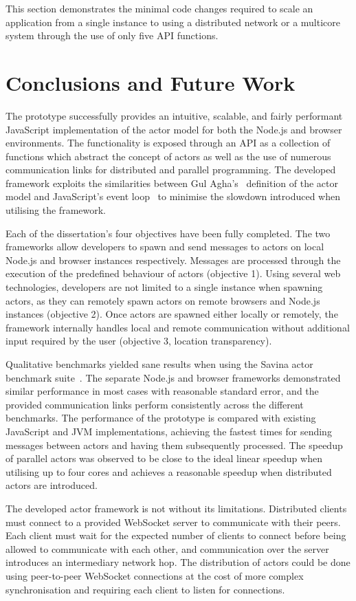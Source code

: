 \documentclass[12pt, a4paper]{report}
\theoremstyle{definition}
\theoremstyle{definition}%
\theoremstyle{definition}%
\theoremstyle{definition}%
\theoremstyle{definition}%
\theoremstyle{definition}%
\begin{document}
This section demonstrates the minimal code changes required to scale an application from a single instance to using a distributed network or a multicore system through the use of only five API functions.
\chapter{Conclusions and Future Work}
The prototype successfully provides an intuitive, scalable, and fairly performant JavaScript implementation of the actor model for both the Node.js and browser environments. The functionality is exposed through an API as a collection of functions which abstract the concept of actors as well as the use of numerous communication links for distributed and parallel programming. The developed framework exploits the similarities between Gul Agha's~\cite{agha1985actors} definition of the actor model and JavaScript's event loop~\cite{eventloopbrowser}\cite{eventloopnode} to minimise the slowdown introduced when utilising the framework. 

Each of the dissertation's four objectives have been fully completed. The two frameworks allow developers to spawn and send messages to actors on local Node.js and browser instances respectively. Messages are processed through the execution of the predefined behaviour of actors (objective 1). Using several web technologies, developers are not limited to a single instance when spawning actors, as they can remotely spawn actors on remote browsers and Node.js instances (objective 2). Once actors are spawned either locally or remotely, the framework internally handles local and remote communication without additional input required by the user (objective 3, location transparency).

Qualitative benchmarks yielded sane results when using the Savina actor benchmark suite~\cite{savina}. The separate Node.js and browser frameworks demonstrated similar performance in most cases with reasonable standard error, and the provided communication links perform consistently across the different benchmarks. The performance of the prototype is compared with existing JavaScript and JVM implementations, achieving the fastest times for sending messages between actors and having them subsequently processed. The speedup of parallel actors was observed to be close to the ideal linear speedup when utilising up to four cores and achieves a reasonable speedup when distributed actors are introduced. 

The developed actor framework is not without its limitations. Distributed clients must connect to a provided WebSocket server to communicate with their peers. Each client must wait for the expected number of clients to connect before being allowed to communicate with each other, and communication over the server introduces an intermediary network hop. The distribution of actors could be done using peer-to-peer WebSocket connections at the cost of more complex synchronisation and requiring each client to listen for connections.
\end{document}
